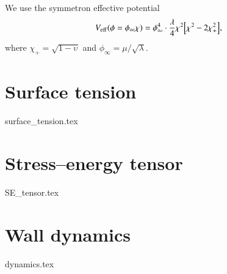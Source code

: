 We use the symmetron effective potential
\begin{equation}\label{eq:walls:symmetron_effective_potential}
    V_\mathrm{eff}(\phi=\phi_\infty \chi) = \phi_{\infty}^4 \cdot \frac{\lambda}{4} \chi^2 {\left[ \chi^2 - 2\chi_+^2 \right]},
\end{equation}
where $\chi_+ = \sqrt{1-\upsilon}$ and $\phi_\infty=\mu/\sqrt{\lambda}$.




\section{Surface tension}\label{app:walls:surface_tension}
    {{surface_tension.tex}}


\section{Stress--energy tensor}\label{app:walls:SE_tensor}
    {{SE_tensor.tex}}

\section{Wall dynamics}\label{app:walls:dynamics}
    {{dynamics.tex}}